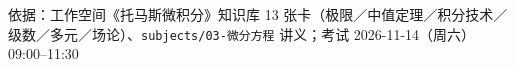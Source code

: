 \documentclass[11pt]{ctexart}
\begin{document}
%
{依据：工作空间《托马斯微积分》知识库 13 张卡（极限／中值定理／积分技术／级数／多元／场论）、\texttt{subjects/03-微分方程} 讲义；考试 2026-11-14（周六）09:00--11:30}

\flowerrule














\end{document}
